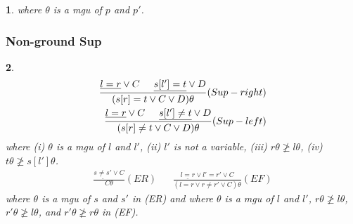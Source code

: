 \documentclass[9pt]{extarticle}
\theoremstyle{theoremstyle}
\newtheorem*{blue}{}
\begin{document}
\begin{multicols}{3}
\begin{minipage}[t]{.30\textwidth}
\begin{blue}
where $\theta$ is a mgu of $p$ and $p'$.
\end{blue}

\subsubsection*{Non-ground Sup}
\begin{blue}
\begin{align*}
	\frac{\underline{l=r} \lor C \hspace{.5cm} \underline{s[l']=t} \lor D}{(s[r]=t \lor C \lor D)\theta} (Sup-right)\\
	\frac{\underline{l=r} \lor C \hspace{.5cm} \underline{s[l']\not=t} \lor D}{(s[r]\not=t \lor C \lor D)\theta} (Sup-left)\\
\end{align*}
where (i) $\theta$ is a mgu of $l$ and $l'$, (ii) $l'$ is not a variable, (iii) $r\theta \not\geq l\theta$, (iv) $t\theta\not\geq s[l']\theta$.
\begin{align*}
	\frac{\underline{s\not= s'} \lor C}{C\theta} (ER) && \frac{\underline{l=r} \lor l'=r' \lor C}{(l=r \lor r\not= r' \lor C)\theta} (EF)
\end{align*}
where $\theta$ is a mgu of $s$ and $s'$ in (ER) and where $\theta$ is a mgu of $l$ and $l'$, $r\theta \not\geq l\theta$, $r'\theta \not\geq l\theta$, and $r'\theta \not\geq r\theta$ in (EF).
\end{blue}

\end{minipage}


\end{multicols}
\end{document}
